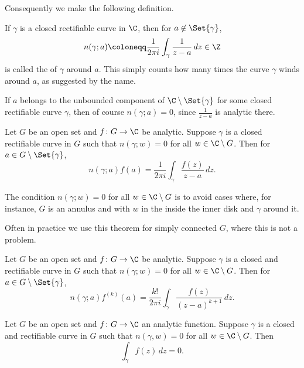 Consequently we make the following definition.

\begin{definition}
	If $\gamma$ is a closed rectifiable curve in $\C$, then for $a \not\in \Set{\gamma}$,
	\[
		n(\gamma; a) \coloneqq \frac{1}{2 \pi i} \int_\gamma \frac{1}{ z - a} \, d z \in \Z
	\]
	is called the  of $\gamma$ around $a$.
	This simply counts how many times the curve $\gamma$ winds around $a$, as suggested by the name.
\end{definition}

\begin{example}
	If $a$ belongs to the unbounded component of $\C \setminus \Set{\gamma}$ for some closed rectifiable curve $\gamma$, then of course $n(\gamma; a) = 0$, since $\frac{1}{z - a}$ is analytic there.
\end{example}

\begin{theorem}\label{thm4.2}
	Let $G$ be an open set and $f \colon G \to \C$ be analytic.
	Suppose $\gamma$ is a closed rectifiable curve in $G$ such that $n(\gamma; w) = 0$ for all $w \in \C \setminus G$.
	Then for $a \in G \setminus \Set{\gamma}$,
	\[
		n(\gamma; a) f(a) = \frac{1}{2 \pi i} \int_\gamma \frac{f(z)}{z - a} \, d z.
	\]
\end{theorem}

\begin{remark}
	The condition $n(\gamma; w) = 0$ for all $w \in \C \setminus G$ is to avoid cases where, for instance, $G$ is an annulus and with $w$ in the inside the inner disk and $\gamma$ around it.

	Often in practice we use this theorem for simply connected $G$, where this is not a problem.
\end{remark}

\begin{corollary}\label{cor4.3}
	Let $G$ be an open set and $f \colon G \to \C$ be analytic.
	Suppose $\gamma$ is a closed and rectifiable curve in $G$ such that $n(\gamma; w) = 0$ for all $w \in \C \setminus G$.
	Then for $a \in G \setminus \Set{\gamma}$,
	\[
		n(\gamma; a) f^{(k)} (a) = \frac{k!}{2 \pi i} \int_\gamma \frac{f(z)}{(z - a)^{k + 1}} \, d z.
	\]
\end{corollary}

\begin{corollary}\label{cor4.4}
	Let $G$ be an open set and $f \colon G \to \C$ an analytic function.
	Suppose $\gamma$ is a closed and rectifiable curve in $G$ such that $n(\gamma, w) = 0$ for all $w \in \C \setminus G$.
	Then
	\[
		\int_\gamma f(z) \, d z = 0.
	\]
\end{corollary}

